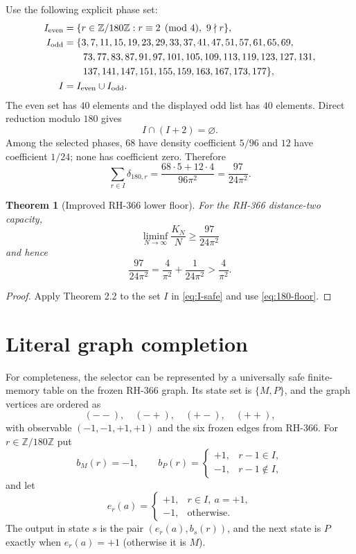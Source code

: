 \documentclass[11pt]{article}
\newtheorem{theorem}{Theorem}[section]
\theoremstyle{definition}
\theoremstyle{remark}
\newcommand{\Z}{\mathbb Z}
\newcommand{\dd}{\delta}
\begin{document}
Use the following explicit phase set:
\begin{align*}
 I_{\rm even}&=\{r\in\Z/180\Z:r\equiv2\pmod4,\ 9\nmid r\},\\
 I_{\rm odd}&=\{3,7,11,15,19,23,29,33,37,41,47,51,57,61,65,69,\\
 &\qquad 73,77,83,87,91,97,101,105,109,113,119,123,127,131,\\
 &\qquad 137,141,147,151,155,159,163,167,173,177\},\\
 I&=I_{\rm even}\cup I_{\rm odd}.
\end{align*}
The even set has $40$ elements and the displayed odd list has $40$ elements.
Direct reduction modulo $180$ gives
\begin{equation}
                 I\cap(I+2)=\varnothing.
\label{eq:I-safe}
\end{equation}
Among the selected phases, $68$ have density coefficient $5/96$ and $12$
have coefficient $1/24$; none has coefficient zero.  Therefore
\begin{equation}
 \sum_{r\in I}\dd_{180,r}
 =\frac{68\cdot5+12\cdot4}{96\pi^2}
 =\frac{97}{24\pi^2}.
 \label{eq:180-floor}
\end{equation}

\begin{theorem}[Improved RH-366 lower floor]
For the RH-366 distance-two capacity,
\begin{equation}
 \boxed{\displaystyle
 \liminf_{N\to\infty}\frac{K_N}{N}\ge\frac{97}{24\pi^2}}
 \label{eq:main-floor}
\end{equation}
and hence
\[
 \frac{97}{24\pi^2}=\frac4{\pi^2}+\frac1{24\pi^2}>
 \frac4{\pi^2}.
\]
\end{theorem}

\begin{proof}
Apply Theorem 2.2 to the set $I$ in \eqref{eq:I-safe} and use
\eqref{eq:180-floor}.
\end{proof}

\section{Literal graph completion}

For completeness, the selector can be represented by a universally safe
finite-memory table on the frozen RH-366 graph.  Its state set is
$\{M,P\}$, and the graph vertices are ordered as
\[
 (--),\quad(-+),\quad(+-),\quad(++),
\]
with observable $(-1,-1,+1,+1)$ and the six frozen edges from RH-366.
For $r\in\Z/180\Z$ put
\[
 b_M(r)=-1,\qquad
 b_P(r)=\begin{cases}+1,&r-1\in I,\\-1,&r-1\notin I,\end{cases}
\]
and let
\[
 e_r(a)=\begin{cases}+1,&r\in I,\ a=+1,\\-1,&\text{otherwise}.\end{cases}
\]
The output in state $s$ is the pair $(e_r(a),b_s(r))$, and the next state is
$P$ exactly when $e_r(a)=+1$ (otherwise it is $M$).
\end{document}
